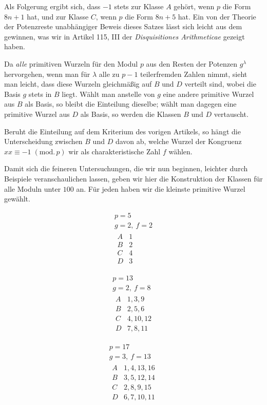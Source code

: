 Als Folgerung ergibt sich, dass $-1$ stets zur Klasse $A$ gehört, wenn $p$ die Form $8n+1$ hat, und zur Klasse $C$, wenn $p$ die Form $8n+5$ hat. Ein von der Theorie der Potenzreste unabhängiger Beweis dieses Satzes lässt sich leicht aus dem gewinnen, was wir in Artikel 115, III der \emph{Disquisitiones Arithmeticae} gezeigt haben.

Da \emph{alle} primitiven Wurzeln für den Modul $p$ aus den Resten der Potenzen $g^\lambda$ hervorgehen, wenn man für $\lambda$ alle zu $p-1$ teilerfremden Zahlen nimmt, sieht man leicht, dass diese Wurzeln gleichmäßig auf $B$ und $D$ verteilt sind, wobei die Basis $g$ stets in $B$ liegt. Wählt man anstelle von $g$ eine andere primitive Wurzel aus $B$ als Basis, so bleibt die Einteilung dieselbe; wählt man dagegen eine primitive Wurzel aus $D$ als Basis, so werden die Klassen $B$ und $D$ vertauscht.

%
Beruht die Einteilung auf dem Kriterium des vorigen Artikels, so hängt die Unterscheidung zwischen $B$ und $D$ davon ab, welche Wurzel der Kongruenz $xx\equiv-1\; (\mathrm{mod.}\,p)$ wir als charakteristische Zahl $f$ wählen.

Damit sich die feineren Untersuchungen, die wir nun beginnen, leichter durch Beispiele veranschaulichen lassen, geben wir hier die Konstruktion der Klassen für alle Moduln unter $100$ an. Für jeden haben wir die kleinste primitive Wurzel gewählt.

\[
\begin{gathered}
p=5\\
g=2,\ f=2\\[3pt]
\begin{array}{c|l}
A&1\\
B&2\\
C&4\\
D&3
\end{array}
\end{gathered}
\]

\[
\begin{gathered}
p=13\\
g=2,\ f=8\\[3pt]
\begin{array}{c|l}
A&1,3,9\\
B&2,5,6\\
C&4,10,12\\
D&7,8,11
\end{array}
\end{gathered}
\]

\[
\begin{gathered}
p=17\\
g=3,\ f=13\\[3pt]
\begin{array}{c|l}
A&1,4,13,16\\
B&3,5,12,14\\
C&2,8,9,15\\
D&6,7,10,11
\end{array}
\end{gathered}
\]

